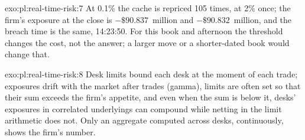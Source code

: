 \begin{solution}{exo:pl:real-time-risk:7}
At 0.1\% the cache is repriced 105 times, at 2\% once; the firm's exposure at the close is $-\$90.837$~million and $-\$90.832$~million, and the
breach time is the same, 14:23:50. For this book and afternoon the threshold changes the cost, not the answer; a larger move or a shorter-dated
book would change that.
\end{solution}

\begin{solution}{exo:pl:real-time-risk:8}
Desk limits bound each desk at the moment of each trade; exposures drift with the market after trades (gamma), limits are often set so that
their sum exceeds the firm's appetite, and even when the sum is below it, desks' exposures in correlated underlyings can compound while
netting in the limit arithmetic does not. Only an aggregate computed across desks, continuously, shows the firm's number.
\end{solution}


